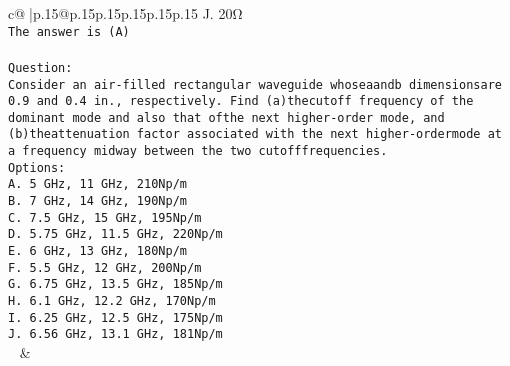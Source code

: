 \documentclass{article}
\begin{document}
{\begin{supertabular}{c@{$\;$}|p{.15\linewidth}@{}p{.15\linewidth}p{.15\linewidth}p{.15\linewidth}p{.15\linewidth}p{.15\linewidth}}
{{{J. 20Ω\\ \tt The answer is (A)\\ \tt \\ \tt Question:\\ \tt Consider an air-filled rectangular waveguide whoseaandb dimensionsare 0.9 and 0.4 in., respectively. Find (a)thecutoff frequency of the dominant mode and also that ofthe next higher-order mode, and (b)theattenuation factor associated with the next higher-ordermode at a frequency midway between the two cutofffrequencies.\\ \tt Options:\\ \tt A. 5 GHz, 11 GHz, 210Np/m\\ \tt B. 7 GHz, 14 GHz, 190Np/m\\ \tt C. 7.5 GHz, 15 GHz, 195Np/m\\ \tt D. 5.75 GHz, 11.5 GHz, 220Np/m\\ \tt E. 6 GHz, 13 GHz, 180Np/m\\ \tt F. 5.5 GHz, 12 GHz, 200Np/m\\ \tt G. 6.75 GHz, 13.5 GHz, 185Np/m\\ \tt H. 6.1 GHz, 12.2 GHz, 170Np/m\\ \tt I. 6.25 GHz, 12.5 GHz, 175Np/m\\ \tt J. 6.56 GHz, 13.1 GHz, 181Np/m\\ \tt  
	  } 
	   } 
	   } 
	 & \\ 
 

    \theutterance {}  


\end{supertabular}}
\end{document}
